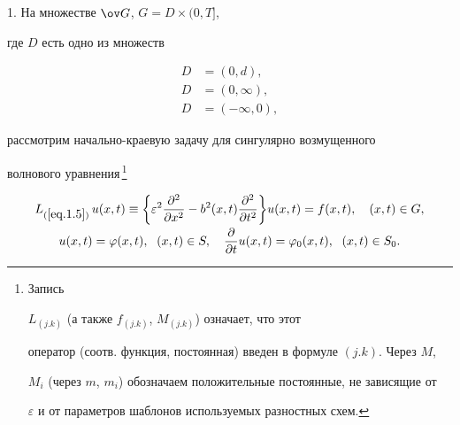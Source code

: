 \label{section.1}





1. На множестве $\ov G $, $G=D\times (0, T]$,


где $D$ есть одно из множеств


\begin{align}


\label{eq.1.1}


D&=(0, d),\\


\label{eq.1.2}


D&=(0, \infty),\\


\label{eq.1.3}


D&=(-\infty, 0),


\end{align}


рассмотрим начально-краевую задачу для сингулярно возмущенного


волнового уравнения\,\footnote{Запись


$L_{(j.k)}$ (а также $f_{(j.k)}$, $M_{(j.k)}$) означает, что этот


оператор (соотв. функция, постоянная) введен в формуле $(j.k)$. Через $M$,


$M_i$ (через $m$, $m_i$) обозначаем положительные постоянные, не зависящие от


$\varepsilon$ и от параметров шаблонов используемых разностных схем.}


\begin{equation}


\label{eq.1.5}


\begin{array}{c}


\displaystyle


L_{(\ref{eq.1.5})} \, u(x, t) \equiv \bigg\{


\varepsilon^2 \frac{\partial^2}{\partial x^2}-


b^2(x,t)\frac{\partial^2}{\partial t^2}\bigg\}


u(x, t)=f(x, t), \quad (x, t)\in G,\\[3mm]


\displaystyle


u(x, t)=\varphi(x, t), \ \; (x, t)\in S,\quad


\frac{\partial}{\partial t} u(x, t)=\varphi_0(x, t), \ \; (x, t)\in S_0.


\end{array}


\end{equation}


